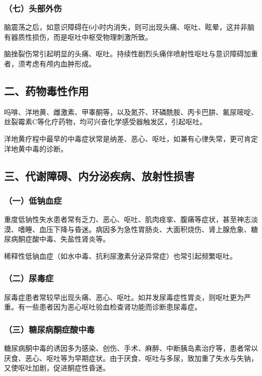 \subsubsection{（七）头部外伤}

脑震荡之后，如意识障碍在6小时内消失，则可出现头痛、呕吐、眩晕，这并非脑有器质性损伤，而是呕吐中枢受物理刺激所致。

脑挫裂伤常引起明显的头痛、呕吐。持续性剧烈头痛伴喷射性呕吐与意识障碍加重者，须考虑有颅内血肿形成。

\subsection{二、药物毒性作用}

吗啡、洋地黄、雌激素、甲睾酮等，以及氮芥、环磷酰胺、丙卡巴肼、氟尿嘧啶、丝裂霉素C等化疗药物，均可兴奋化学感受器触发区，引起呕吐。

洋地黄疗程中最早的中毒症状常是纳差、恶心、呕吐，如兼有心律失常，更可肯定洋地黄中毒的诊断。

\subsection{三、代谢障碍、内分泌疾病、放射性损害}

\subsubsection{（一）低钠血症}

重度低钠性失水患者常有乏力、恶心、呕吐、肌肉痉挛、腹痛等症状，甚至神志淡漠、嗜睡、血压下降与昏迷。病因多为急性胃肠炎、大面积烧伤、肾上腺危象、糖尿病酮症酸中毒、失盐性肾炎等。

稀释性低钠血症（如水中毒、抗利尿激素分泌异常症）也常引起频繁呕吐。

\subsubsection{（二）尿毒症}

尿毒症患者常较早出现头痛、恶心、呕吐。如并发尿毒症性胃炎，则呕吐更为严重。有一些患者因为恶心呕吐验血检查肾功能而诊断患尿毒症。

\subsubsection{（三）糖尿病酮症酸中毒}

糖尿病酮中毒的诱因多为感染、创伤、手术、麻醉、中断胰岛素治疗等，患者常以厌食、恶心、呕吐等为早期症状。由于厌食、呕吐与多尿，致加重了失水与失钠，又使呕吐加剧，促进酮症性昏迷。

